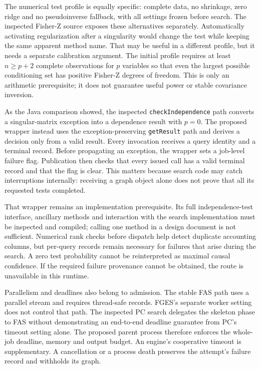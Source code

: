 The numerical test profile is equally specific: complete data, no
shrinkage, zero ridge and no pseudoinverse fallback, with all settings
frozen before search. The inspected Fisher-Z source exposes these
alternatives separately. Automatically activating regularization after a
singularity would change the test while keeping the same apparent method
name. That may be useful in a different profile, but it needs a separate
calibration argument. The initial profile requires at least
\(n\geq p+2\) complete observations for \(p\) variables so that even the
largest possible conditioning set has positive Fisher-Z degrees of
freedom. This is only an arithmetic prerequisite; it does not guarantee
useful power or stable covariance inversion.
\citep{exec13_java_adapter_contract,exec13_java_adapter_source}

As the Java comparison showed, the inspected \texttt{checkIndependence}
path converts a singular-matrix exception into a dependence result with
\(p=0\). The proposed wrapper instead uses the exception-preserving
\texttt{getResult} path and derives a decision only from a valid result.
Every invocation receives a query identity and a terminal record. Before
propagating an exception, the wrapper sets a job-level failure flag.
Publication then checks that every issued call has a valid terminal
record and that the flag is clear. This matters because search code may
catch interruptions internally: receiving a graph object alone does not
prove that all its requested tests completed.
\citep{exec13_java_tetrad,exec13_java_adapter_source,exec13_java_adapter_contract}

That wrapper remains an implementation prerequisite. Its full
independence-test interface, ancillary methods and interaction with the
search implementation must be inspected and compiled; calling one method
in a design document is not sufficient. Numerical rank checks before
dispatch help detect duplicate accounting columns, but per-query records
remain necessary for failures that arise during the search. A zero test
probability cannot be reinterpreted as maximal causal confidence. If the
required failure provenance cannot be obtained, the route is unavailable
in this runtime. \citep{exec13_java_adapter_contract}

Parallelism and deadlines also belong to admission. The stable FAS path
uses a parallel stream and requires thread-safe records. FGES's separate
worker setting does not control that path. The inspected PC search
delegates the skeleton phase to FAS without demonstrating an end-to-end
deadline guarantee from PC's timeout setting alone. The proposed parent
process therefore enforces the whole-job deadline, memory and output
budget. An engine's cooperative timeout is supplementary. A cancellation
or a process death preserves the attempt's failure record and withholds
its graph.
\citep{exec13_java_adapter_source,exec13_java_adapter_contract}

